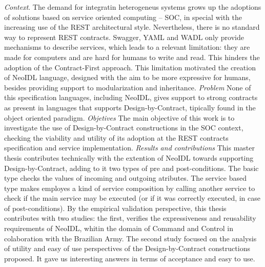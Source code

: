 \emph{Context}. The demand for integratin heterogeneus systems grows up the
adoptions of solutions based on service oriented computing -- SOC, in special
with the increasing use of the REST architectural style. Nevertheless, there
is no standard way to represent REST contracts.
Swagger, YAML and WADL only provide mechanisms to describe services, which
leads to a relevant limitation: they are made for computers and
are hard for humans to write and read. This hinders the adoption of the 
Contract-First approach. This limitation motivated the creation of NeoIDL
language, designed with the aim to be more expressive for humans, besides
providing support to modularization and inheritance. \emph{Problem} None of this
specification languages, including NeoIDL, gives support to strong contracts
as present in languages that supports Design-by-Contract, tipically found in
the  object oriented paradigm. \emph{Objetives} The main objective of this work
is  to investigate the use of Design-by-Contract constructions in the SOC context, 
checking the viability and utility of its adoption at the REST contracts specification
and service implementation. \emph{Results and contributions} This
master thesis contributes technically with the extention of NeoIDL towards
supporting Design-by-Contract, adding to it two types of pre and
post-conditions.
The basic type checks the values of incoming and outgoing atributes. The
service based type makes employes a kind of service composition by
calling another service to check if the main service may be executed (or if it was correctly executed, in case of
post-conditions). By the empirical validation perspective, this thesis
contributes with two studies: the first, verifies the expressiveness and
reusability requirements of NeoIDL, whitin the domain of Command
and Control in colaboration with the Brazilian Army. The second
study focused on the analysis of utility and easy of use perspectives of the 
Design-by-Contract constructions proposed. It gave us interesting answers in
terms of acceptance and easy to use.
